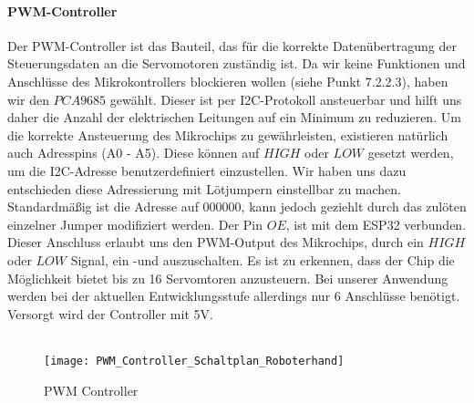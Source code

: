 \documentclass[titlepage,12pt,twoside]{article}
\begin{document}
\paragraph{PWM-Controller}
\hfill \break
\hfill \break
Der PWM-Controller ist das Bauteil, das für die korrekte Datenübertragung der Steuerungsdaten an die Servomotoren zuständig ist. Da wir keine Funktionen und Anschlüsse des Mikrokontrollers blockieren wollen (siehe Punkt 7.2.2.3), 
haben wir den $PCA9685$ gewählt. Dieser ist per I2C-Protokoll ansteuerbar und hilft uns daher die Anzahl der elektrischen Leitungen auf ein Minimum zu reduzieren. Um die korrekte Ansteuerung des Mikrochips zu gewährleisten, existieren
natürlich auch Adresspins (A0 - A5). Diese können auf $HIGH$ oder $LOW$ gesetzt werden, um die I2C-Adresse benutzerdefiniert einzustellen. Wir haben uns dazu entschieden diese Adressierung mit Lötjumpern einstellbar zu machen. Standardmäßig
ist die Adresse auf $0 0 0 0 0 0$, kann jedoch geziehlt durch das zulöten einzelner Jumper modifiziert werden. Der Pin $OE$, ist mit dem ESP32 verbunden. Dieser Anschluss erlaubt uns den PWM-Output des Mikrochips, durch ein $HIGH$ oder $LOW$ 
Signal, ein -und auszuschalten. Es ist zu erkennen, dass der Chip die Möglichkeit bietet bis zu 16 Servomtoren anzusteuern. Bei unserer Anwendung werden bei der aktuellen Entwicklungsstufe allerdings nur 6 Anschlüsse benötigt. Versorgt wird
der Controller mit 5V. \\
\\
\begin{figure}[H]
	\begin{center}
		\scalebox{1.0}
		{\texttt{[image: PWM\_Controller\_Schaltplan\_Roboterhand]}}
		\caption{PWM Controller}
		\label{fig:PWM_Controller_Schaltplan_Roboterhand}		
	\end{center}
\end{figure}
\hfill \break
\end{document}
